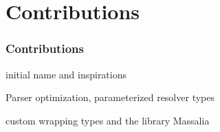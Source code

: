 \section{Contributions}

\begin{frame}\frametitle{Contributions}

\begin{itemize} 
  
     initial name and inspirations

     Parser optimization, parameterized resolver types
    
     custom wrapping types and the library Massalia

\end{itemize}

\end{frame}